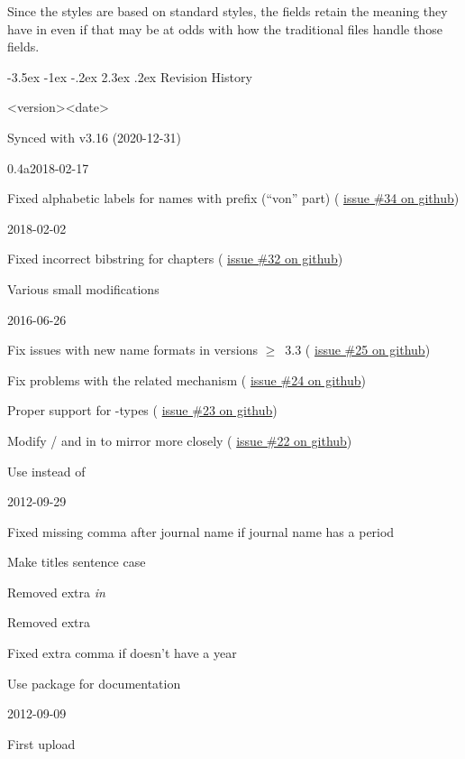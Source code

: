 \documentclass{article}
\makeatletter
\let\accentcolour\spotcolor
\newcommand*{\allsectionsfont}{\sffamily\accentcolour}
\renewcommand\section{\@startsection {section}{1}{\z@}%
                                     {-3.5ex \@plus -1ex \@minus -.2ex}%
                                     {2.3ex \@plus.2ex}%
                                     {\normalfont\Large\bfseries\allsectionsfont}}
\newcommand*{\gitissuelink}[1]{%
  \href{https://github.com/moewew/biblatex-trad/issues/#1}{issue \##1 on github}}
\makeatother
\begin{document}
Since the styles are based on  standard styles, the fields retain the meaning
they have in  even if that may be at odds with how the traditional 
files handle those fields.


\section{Revision History}\label{apx:log}
\begin{changelog}
\begin{release}{<version>}{<date>}
\item Synced with  v3.16 (2020-12-31)
\end{release}

\begin{release}{0.4a}{2018-02-17}
\item Fixed alphabetic labels for names with prefix (\enquote{von} part) (\gitissuelink{34})
\end{release}

\begin{release}{0.4}{2018-02-02}
\item Fixed incorrect bibstring for chapters (\gitissuelink{32})
\item Various small modifications
\end{release}

\begin{release}{0.3}{2016-06-26}
\item Fix issues with new name formats in  versions $\geq$~3.3 (\gitissuelink{25})
\item Fix problems with the related mechanism (\gitissuelink{24})
\item Proper support for -types (\gitissuelink{23})
\item Modify / and  in  to mirror  more closely (\gitissuelink{22})
\item Use  instead of 
\end{release}

\begin{release}{0.2}{2012-09-29}
\item Fixed missing comma after journal name if journal name has a period
\item Make titles sentence case
\item Removed extra \emph{in}
\item Removed extra 
\item Fixed extra comma if  doesn't have a year
\item Use package  for documentation
\end{release}

\begin{release}{0.1}{2012-09-09}
\item First upload
\end{release}
\end{changelog}
\end{document}
